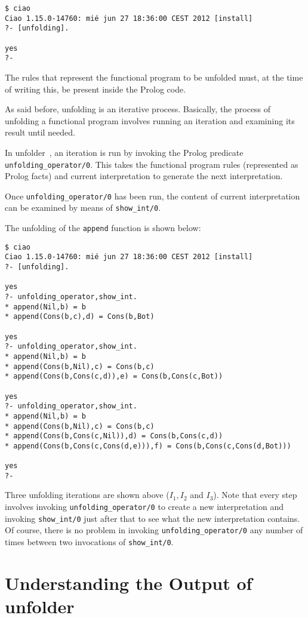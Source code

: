 \documentclass[11pt,a4paper,twoside,openright]{book}
\newcommand{\unfolder}{{\textsf{unfolder~}}}
\begin{document}
\begin{verbatim}
$ ciao
Ciao 1.15.0-14760: mié jun 27 18:36:00 CEST 2012 [install]
?- [unfolding].

yes
?-
\end{verbatim}

The rules that represent the functional program to be unfolded must,
at the time of writing this, be present inside the Prolog code.

As said before, unfolding is an iterative process. Basically, the
process of unfolding a functional program involves running an
iteration and examining its result until needed.

In \unfolder, an iteration is run by invoking the Prolog predicate \\
{\tt unfolding\_operator/0}. This takes the functional program
rules (represented as Prolog facts) and current interpretation to
generate the next interpretation.

Once {\tt unfolding\_operator/0} has been run, the content of current
interpretation can be examined by means of {\tt show\_int/0}.

The unfolding of the {\tt append} function is shown below:

\begin{verbatim}
$ ciao
Ciao 1.15.0-14760: mié jun 27 18:36:00 CEST 2012 [install]
?- [unfolding].

yes
?- unfolding_operator,show_int.
* append(Nil,b) = b
* append(Cons(b,c),d) = Cons(b,Bot)

yes
?- unfolding_operator,show_int.
* append(Nil,b) = b
* append(Cons(b,Nil),c) = Cons(b,c)
* append(Cons(b,Cons(c,d)),e) = Cons(b,Cons(c,Bot))

yes
?- unfolding_operator,show_int.
* append(Nil,b) = b
* append(Cons(b,Nil),c) = Cons(b,c)
* append(Cons(b,Cons(c,Nil)),d) = Cons(b,Cons(c,d))
* append(Cons(b,Cons(c,Cons(d,e))),f) = Cons(b,Cons(c,Cons(d,Bot)))

yes
?-
\end{verbatim}  

\noindent
Three unfolding iterations are shown above ($I_1, I_2$ and $I_3$). Note
that every step involves invoking {\tt unfolding\_operator/0} to
create a new interpretation and invoking {\tt show\_int/0} just after
that to see what the new interpretation contains. Of course, there is
no problem in invoking {\tt unfolding\_operator/0} any number of times
between two invocations of {\tt show\_int/0}.

\section{Understanding the Output of \unfolder}
\label{sec_understanding_output}
\end{document}
